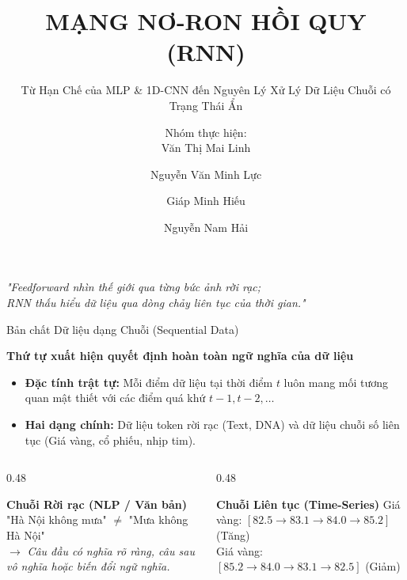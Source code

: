 \documentclass[aspectratio=169, 10pt]{beamer}
\title[Chuyên đề RNN]{MẠNG NƠ-RON HỒI QUY (RNN)}
\subtitle{Từ Hạn Chế của MLP \& 1D-CNN đến Nguyên Lý Xử Lý Dữ Liệu Chuỗi có Trạng Thái Ẩn}
\author{Nhóm thực hiện:\\Văn Thị Mai Linh \and Nguyễn Văn Minh Lực \and Giáp Minh Hiếu \and Nguyễn Nam Hải}
\institute{Chuyên đề Học Sâu (Deep Learning)}
\date{}
\begin{document}
\begin{frame}[plain]
\titlepage
\vspace{-0.6cm}
\begin{center}
\textit{\footnotesize "Feedforward nhìn thế giới qua từng bức ảnh rời rạc;\\RNN thấu hiểu dữ liệu qua dòng chảy liên tục của thời gian."}
\end{center}
\end{frame}

\begin{frame}{Bản chất Dữ liệu dạng Chuỗi (Sequential Data)}
\begin{block}{\textbf{Thứ tự xuất hiện quyết định hoàn toàn ngữ nghĩa của dữ liệu}}
\begin{itemize}
    \item \textbf{Đặc tính trật tự:} Mỗi điểm dữ liệu tại thời điểm \(t\) luôn mang mối tương quan mật thiết với các điểm quá khứ \(t-1, t-2, \dots\)
    \item \textbf{Hai dạng chính:} Dữ liệu token rời rạc (Text, DNA) và dữ liệu chuỗi số liên tục (Giá vàng, cổ phiếu, nhịp tim).
\end{itemize}
\end{block}

\vspace{0.3cm}
\begin{columns}[T]
\begin{column}{0.48\textwidth}
\begin{exampleblock}{\textbf{Chuỗi Rời rạc (NLP / Văn bản)}}
"Hà Nội không mưa" \(\neq\) "Mưa không Hà Nội"\\
\vspace{0.2cm}
\(\rightarrow\) \textit{Câu đầu có nghĩa rõ ràng, câu sau vô nghĩa hoặc biến đổi ngữ nghĩa.}
\end{exampleblock}
\end{column}
\begin{column}{0.48\textwidth}
\begin{alertblock}{\textbf{Chuỗi Liên tục (Time-Series)}}
Giá vàng: \([ 82.5 \rightarrow 83.1 \rightarrow 84.0 \rightarrow 85.2 ]\) (Tăng)\\
Giá vàng: \([ 85.2 \rightarrow 84.0 \rightarrow 83.1 \rightarrow 82.5 ]\) (Giảm)
\end{alertblock}
\end{column}
\end{columns}
\end{frame}
\end{document}
